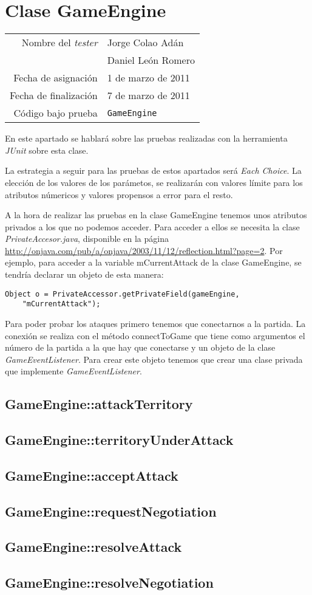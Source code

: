 \section{Clase GameEngine}

{\small
\begin{tabular}{r|l}
Nombre del \textit{tester} & Jorge Colao Adán \\
& Daniel León Romero\\
Fecha de asignación & 1 de marzo de 2011 \\
Fecha de finalización & 7 de marzo de 2011 \\
Código bajo prueba & \texttt{GameEngine}
\end{tabular}
}

En este apartado se hablará sobre las pruebas realizadas con la herramienta \textit{JUnit} sobre esta clase.

La estrategia a seguir para las pruebas de estos apartados será \textit{Each Choice}. La elección de los valores de los parámetos, se realizarán con valores límite para los atributos númericos y valores propensos a error para el resto.

A la hora de realizar las pruebas en la clase GameEngine tenemos unos atributos privados a los que no podemos acceder. Para acceder a ellos se necesita la clase \textit{PrivateAccesor.java}, disponible en la página \url{http://onjava.com/pub/a/onjava/2003/11/12/reflection.html?page=2}. Por ejemplo, para acceder a la variable mCurrentAttack de la clase GameEngine, se tendría declarar un objeto de esta manera:
\begin{verbatim}
Object o = PrivateAccessor.getPrivateField(gameEngine, 
	"mCurrentAttack");
\end{verbatim}

Para poder probar los ataques primero tenemos que conectarnos a la partida. La conexión se realiza con el método connectToGame que tiene como argumentos el número de la partida a la que hay que conectarse y un objeto de la clase \textit{GameEventListener}. Para crear este objeto tenemos que crear una clase privada que implemente \textit{GameEventListener}.

\subsection{GameEngine::attackTerritory}



\subsection{GameEngine::territoryUnderAttack}
\subsection{GameEngine::acceptAttack}
\subsection{GameEngine::requestNegotiation}
\subsection{GameEngine::resolveAttack}
\subsection{GameEngine::resolveNegotiation}
